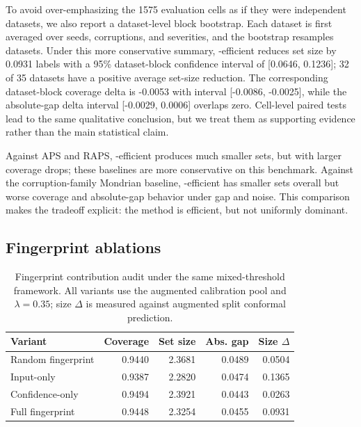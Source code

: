 To avoid over-emphasizing the 1575 evaluation cells as if they were independent datasets, we also report a dataset-level block bootstrap. Each dataset is first averaged over seeds, corruptions, and severities, and the bootstrap resamples datasets. Under this more conservative summary, \fastcp{}-efficient reduces set size by 0.0931 labels with a 95\% dataset-block confidence interval of [0.0646, 0.1236]; 32 of 35 datasets have a positive average set-size reduction. The corresponding dataset-block coverage delta is -0.0053 with interval [-0.0086, -0.0025], while the absolute-gap delta interval [-0.0029, 0.0006] overlaps zero. Cell-level paired tests lead to the same qualitative conclusion, but we treat them as supporting evidence rather than the main statistical claim.

Against APS and RAPS, \fastcp{}-efficient produces much smaller sets, but with larger coverage drops; these baselines are more conservative on this benchmark. Against the corruption-family Mondrian baseline, \fastcp{}-efficient has smaller sets overall but worse coverage and absolute-gap behavior under gap and noise. This comparison makes the tradeoff explicit: the method is efficient, but not uniformly dominant.

\subsection{Fingerprint ablations}

\begin{table}[t]
\centering
\small
\caption{Fingerprint contribution audit under the same mixed-threshold framework. All variants use the augmented calibration pool and $\lambda=0.35$; size $\Delta$ is measured against augmented split conformal prediction.}
\label{tab:fingerprint_variants}
\begin{tabular}{lrrrr}
\toprule
Variant & Coverage & Set size & Abs. gap & Size $\Delta$ \\
\midrule
Random fingerprint & 0.9440 & 2.3681 & 0.0489 & 0.0504 \\
Input-only & 0.9387 & 2.2820 & 0.0474 & 0.1365 \\
Confidence-only & 0.9494 & 2.3921 & 0.0443 & 0.0263 \\
Full fingerprint & 0.9448 & 2.3254 & 0.0455 & 0.0931 \\
\bottomrule
\end{tabular}
\end{table}

